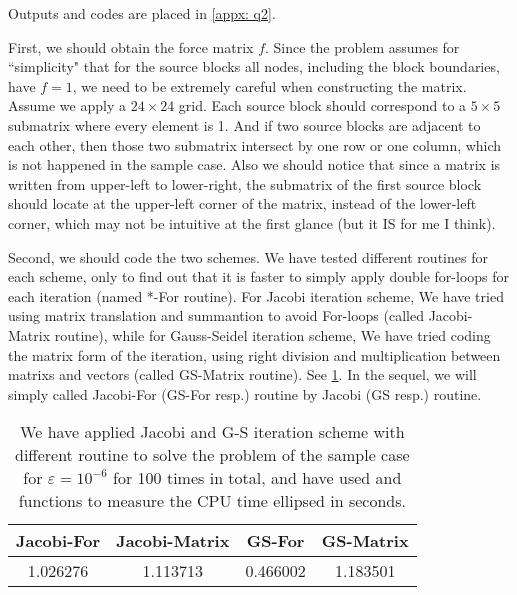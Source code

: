 \documentclass{assignment}[2019/10/15]
\begin{document}
    Outputs and codes are placed in \ref{appx: q2}.

    First, we should obtain the force matrix $f$. Since the problem assumes for ``simplicity" that for the source blocks all nodes, including the block boundaries, have $f = 1$, we need to be extremely careful when constructing the matrix. Assume we apply a $24\times 24$ grid. Each source block should correspond to a $5\times 5$ submatrix where every element is 1. And if two source blocks are adjacent to each other, then those two submatrix intersect by one row or one column, which is not happened in the sample case. Also we should notice that since a matrix is written from upper-left to lower-right, the submatrix of the first source block should locate at the upper-left corner of the matrix, instead of the lower-left corner, which may not be intuitive at the first glance (but it IS for me I think).

    Second, we should code the two schemes. We have tested different routines  for each scheme, only to find out that it is faster to simply apply double for-loops for each iteration (named *-For routine). For Jacobi iteration scheme, We have tried using matrix translation and summantion to avoid For-loops (called Jacobi-Matrix routine), while for Gauss-Seidel iteration scheme, We have tried coding the matrix form of the iteration, using right division and multiplication between matrixs and vectors (called GS-Matrix routine). See \ref{tbl: q2}. In the sequel, we will simply called Jacobi-For (GS-For resp.) routine by Jacobi (GS resp.) routine.

    \begin{table}[htb]
        \begin{center}
            \caption{We have applied Jacobi and G-S iteration scheme with different routine to solve the problem of the sample case for $\varepsilon=10^{-6}$ for 100 times in total, and have used  and  functions to measure the CPU time ellipsed in seconds.}
            \label{tbl: q2}
            \begin{tabular}{cccc}
                \toprule
                Jacobi-For & Jacobi-Matrix & GS-For & GS-Matrix\\
                \midrule
                1.026276 & 1.113713 & 0.466002 & 1.183501 \\
                \bottomrule
            \end{tabular}
        \end{center}
    \end{table}
\end{document}
